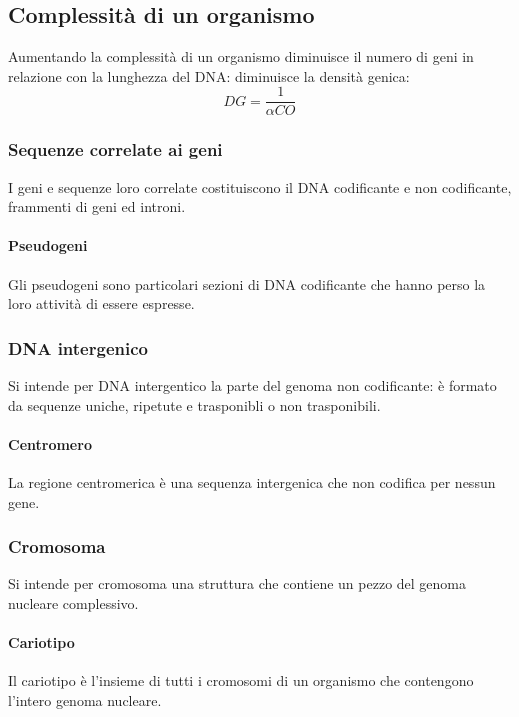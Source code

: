 	\subsection{Complessit\`a di un organismo}
	Aumentando la complessit\`a di un organismo diminuisce il numero di geni in relazione con la lunghezza del DNA: diminuisce la densit\`a genica:
	\[DG=\dfrac{1}{\alpha CO}\]

		\subsubsection{Sequenze correlate ai geni}
		I geni e sequenze loro correlate costituiscono il DNA codificante e non codificante, frammenti di geni ed introni.

			\paragraph{Pseudogeni}
			Gli pseudogeni sono particolari sezioni di DNA codificante che hanno perso la loro attivit\`a di essere espresse.

		\subsubsection{DNA intergenico}
		Si intende per DNA intergentico la parte del genoma non codificante: \`e formato da sequenze uniche, ripetute e trasponibli o non trasponibili.

			\paragraph{Centromero}
			La regione centromerica \`e una sequenza intergenica che non codifica per nessun gene.


		\subsubsection{Cromosoma}
		Si intende per cromosoma una struttura che contiene un pezzo del genoma nucleare complessivo.

			\paragraph{Cariotipo}
			Il cariotipo \`e l'insieme di tutti i cromosomi di un organismo che contengono l'intero genoma nucleare.
